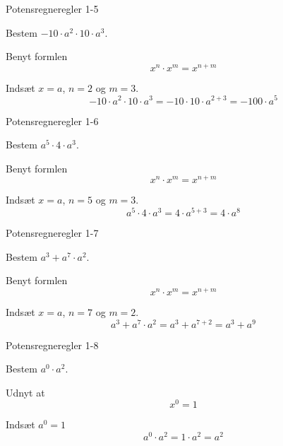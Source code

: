\documentclass{article}
\begin{document}
\newpage

\begin{exercise}{Potensregneregler 1-5}
	
	Bestem $-10 \cdot a^2 \cdot 10 \cdot a^3$.
	
	
	\hint
	
	Benyt formlen
	\[
	x^n \cdot x^m = x^{n+m}
	\]
	
	\hint
	
	Indsæt $x=a$, $n=2$ og $m=3$.
	\[
	-10 \cdot a^2 \cdot 10 \cdot a^3 = -10 \cdot 10 \cdot a^{2+3} =  -100 \cdot a^5
	\]
	
\end{exercise}

\newpage

\begin{exercise}{Potensregneregler 1-6}
	
	Bestem $a^5 \cdot 4 \cdot  a^3$.
	
	
	\hint
	
	Benyt formlen
	\[
	x^n \cdot x^m = x^{n+m}
	\]
	
	\hint
	
	Indsæt $x=a$, $n=5$ og $m=3$.
	\[
	a^5 \cdot 4 \cdot a^3 = 4 \cdot a^{5+3} = 4 \cdot a^8
	\]
	
\end{exercise}

\newpage

\begin{exercise}{Potensregneregler 1-7}
	
	Bestem $a^3 + a^7 \cdot a^2$.
	
	
	\hint
	
	Benyt formlen
	\[
	x^n \cdot x^m = x^{n+m}
	\]
	
	\hint
	
	Indsæt $x=a$, $n=7$ og $m=2$.
	\[
	a^3 + a^7 \cdot a^2 = a^3 + a^{7+2} = a^3 + a^9
	\]
	
\end{exercise}

\newpage

\begin{exercise}{Potensregneregler 1-8}
	
	Bestem $a^0 \cdot a^2$.
	
	
	\hint
	
	Udnyt at
	\[
	x^0 = 1
	\]
	
	\hint
	
	Indsæt $a^0=1$
	\[
	a^0 \cdot a^2 = 1 \cdot a^2 = a^2
	\]
	
\end{exercise}
\end{document}
